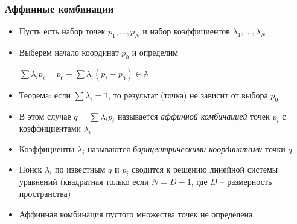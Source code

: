 \documentclass[10pt]{beamer}
\begin{document}
\begin{frame}[fragile]
\frametitle{Аффинные комбинации}
\begin{itemize}
\item Пусть есть набор точек \begin{math}p_1, \dots, p_N\end{math} и набор коэффициентов \begin{math}\lambda_1, \dots, \lambda_N\end{math}
\pause
\item Выберем начало координат \begin{math}p_0\end{math} и определим

\begin{math}\sum \lambda_i p_i = p_0 + \sum \lambda_i (p_i - p_0) \in \mathbb A\end{math}
\pause
\item Теорема: если \begin{math}\sum \lambda_i = 1\end{math}, то результат (точка) не зависит от выбора \begin{math}p_0\end{math}
\pause
\item В этом случае \begin{math}q = \sum \lambda_i p_i\end{math} называется \textit{аффинной комбинацией} точек \begin{math}p_i\end{math} с коэффициентами \begin{math}\lambda_i\end{math}
\pause
\item Коэффициенты \begin{math}\lambda_i\end{math} называются \textit{барицентрическими координатами} точки \begin{math}q\end{math}
\pause
\item Поиск \begin{math}\lambda_i\end{math} по известным \begin{math}q\end{math} и \begin{math}p_i\end{math} сводится к решению линейной системы уравнений (квадратная только если \begin{math}N = D + 1\end{math}, где \begin{math}D\end{math} -- размерность пространства)
\pause
\item Аффинная комбинация пустого множества точек не определена
\end{itemize}
\end{frame}
\end{document}
